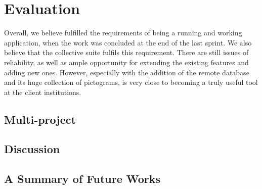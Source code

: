 \chapter{Evaluation}\label{chap:evaluation}

Overall, we believe \launcher fulfilled the requirements of being a running and working application, when the work was concluded at the end of the last sprint.
We also believe that the collective \giraf suite fulfils this requirement.
There are still issues of reliability, as well as ample opportunity for extending the existing features and adding new ones.
However, especially with the addition of the remote database and its huge collection of pictograms, \giraf is very close to becoming a truly useful tool at the client institutions. 

\section{Multi-project}\label{sec:eval:multiproject}


\section{Discussion}\label{sec:eval:discussion}


\section{A Summary of Future Works}
